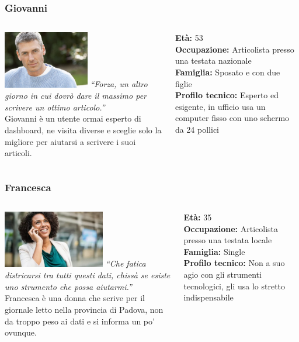 \documentclass[handout]{beamer}
\begin{document}
		\begin{frame}
			\frametitle{Giovanni}
			\begin{columns}[t]
				\begin{column}[T]{6cm}
					\includegraphics[height=2.5cm]{img/giovanni}
					\textit{``Forza, un altro giorno in cui dovrò dare il massimo per scrivere un ottimo articolo.''}\\
					Giovanni è un utente ormai esperto di dashboard, ne visita diverse e sceglie solo la migliore per aiutarsi a scrivere i suoi articoli.
				\end{column}
				\begin{column}[T]{5cm}
					\textbf{Età:} 53\\
					\textbf{Occupazione:} Articolista presso una testata nazionale\\
					\textbf{Famiglia:} Sposato e con due figlie\\
					\textbf{Profilo tecnico:} Esperto ed esigente, in ufficio usa un computer fisso con uno schermo da 24 pollici\\
				\end{column}
			\end{columns}
		\end{frame}

		\begin{frame}
			\frametitle{Francesca}
			\begin{columns}[t]
				\begin{column}[T]{6cm}
					\includegraphics[height=2.5cm]{img/francesca}
					\textit{``Che fatica districarsi tra tutti questi dati, chissà se esiste uno strumento che possa aiutarmi.''}\\
					Francesca è una donna che scrive per il giornale letto nella provincia di Padova, non da troppo peso ai dati e si informa un po' ovunque.
				\end{column}
				\begin{column}[T]{5cm}
					\textbf{Età:} 35\\
					\textbf{Occupazione:} Articolista presso una testata locale\\
					\textbf{Famiglia:} Single\\
					\textbf{Profilo tecnico:} Non a suo agio con gli strumenti tecnologici, gli usa lo stretto indispensabile\\
				\end{column}
			\end{columns}
		\end{frame}
\end{document}
